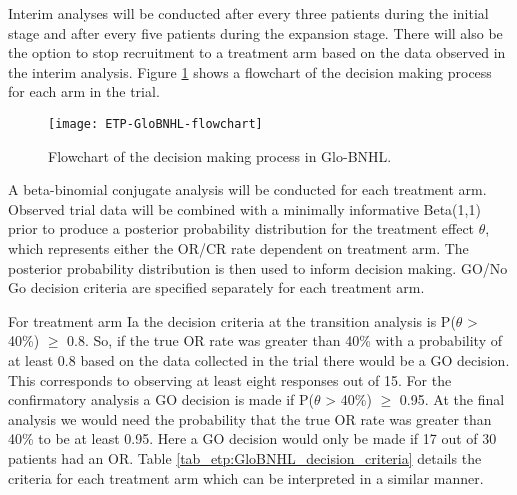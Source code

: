 Interim analyses will be conducted after every three patients during the initial stage and after every five patients during the expansion stage. There will also be the option to stop recruitment to a treatment arm based on the data observed in the interim analysis. Figure \ref{fig_etp:Glo-BNHLflowchart} shows a flowchart of the decision making process for each arm in the trial. 

\begin{figure}[h!]
	\centering
	\caption{Flowchart of the decision making process in Glo-BNHL.}
	\label{fig_etp:Glo-BNHLflowchart}
	\texttt{[image: ETP-GloBNHL-flowchart]}
\end{figure}

A beta-binomial conjugate analysis will be conducted for each treatment arm. Observed trial data will be combined with a minimally informative Beta(1,1) prior to produce a posterior probability distribution for the treatment effect $\theta$, which represents either the OR/CR rate dependent on treatment arm. The posterior probability distribution is then used to inform decision making. GO/No Go decision criteria are specified separately for each treatment arm. 

For treatment arm \RN{1}a the decision criteria at the transition analysis is P($\theta$ > 40\%) $\geq$ 0.8. So, if the true OR rate was greater than 40\% with a probability of at least 0.8 based on the data collected in the trial there would be a GO decision. This corresponds to observing at least eight responses out of 15. For the confirmatory analysis a GO decision is made if P($\theta$ > 40\%) $\geq$ 0.95. At the final analysis we would need the probability that the true OR rate was greater than 40\% to be at least 0.95. Here a GO decision would only be made if 17 out of 30 patients had an OR. Table \ref{tab_etp:GloBNHL_decision_criteria} details the criteria for each treatment arm which can be interpreted in a similar manner. 

